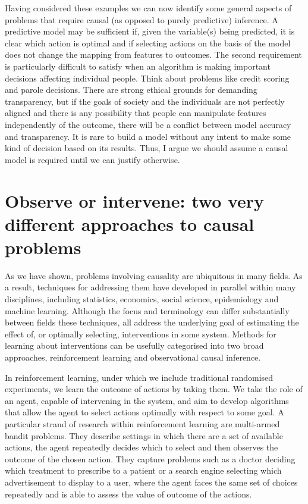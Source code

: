 \documentclass[11pt,a4paper,twoside]{report}
\theoremstyle{plain}
\theoremstyle{definition}
\begin{document}
Having considered these examples we can now identify some general aspects of problems that require causal (as opposed to purely predictive) inference. A predictive model may be sufficient if, given the variable(s) being predicted, it is clear which action is optimal and if selecting actions on the basis of the model does not change the mapping from features to outcomes. The second requirement is particularly difficult to satisfy when an algorithm is making important decisions affecting individual people. Think about problems like credit scoring and parole decisions. There are strong ethical grounds for demanding transparency, but if the goals of society and the individuals are not perfectly aligned and there is any possibility that people can manipulate features independently of the outcome, there will be a conflict between model accuracy and transparency. It is rare to build a model without any intent to make some kind of decision based on its results. Thus, I argue we should assume a causal model is required until we can justify otherwise.  

\section{Observe or intervene: two very different approaches to causal problems}

As we have shown, problems involving causality are ubiquitous in many fields. As a result, techniques for addressing them have developed in parallel within many disciplines, including statistics, economics, social science, epidemiology and machine learning. Although the focus and terminology can differ substantially between fields these techniques, all address the underlying goal of estimating the effect of, or optimally selecting, interventions in some system. Methods for learning about interventions can be usefully categorised into two broad approaches, reinforcement learning and observational causal inference. 

In reinforcement learning, under which we include traditional randomised experiments, we learn the outcome of actions by taking them. We take the role of an agent, capable of intervening in the system, and aim to develop algorithms that allow the agent to select actions optimally with respect to some goal. A particular strand of research within reinforcement learning are multi-armed bandit problems. They describe settings in which there are a set of available actions, the agent repeatedly decides which to select and then observes the outcome of the chosen action. They capture problems such as a doctor deciding which treatment to prescribe to a patient or a search engine selecting which advertisement to display to a user, where the agent faces the same set of choices repeatedly and is able to assess the value of outcome of the actions. 
\end{document}
